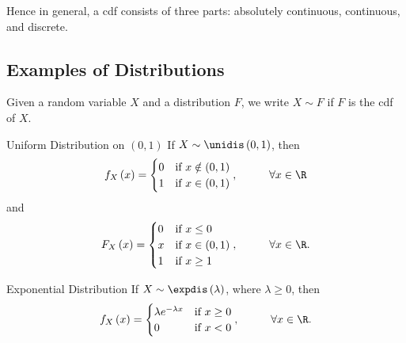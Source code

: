 \documentclass[stat901]{subfiles}
\begin{document}
    \np Hence in general, a cdf consists of three parts: absolutely continuous, continuous, and discrete.

    \subsection{Examples of Distributions}

    Given a random variable $X$ and a distribution $F$, we write $X\sim F$ if $F$ is the cdf of $X$.

    \clearpage

    \begin{example}{Uniform Distribution on $\left( 0,1 \right)$}
        If $X\sim\unidis\left( 0,1 \right)$, then
        \begin{equation*}
            f_X\left( x \right) = \begin{cases} 0 & \text{if $x\notin\left( 0,1 \right)$} \\ 1 & \text{if $x\in\left( 0,1 \right)$} \end{cases},\hspace{1cm}\forall x\in\R
        \end{equation*}
        and
        \begin{equation*}
            F_X\left( x \right) = \begin{cases} 0 & \text{if $x\leq 0$} \\ x & \text{if $x\in\left( 0,1 \right)$} \\ 1 & \text{if $x\geq 1$} \end{cases}, \hspace{1cm}\forall x\in\R.
        \end{equation*}
    \end{example}

    \rruleline
    
    \begin{example}{Exponential Distribution}
        If $X\sim\expdis\left( \lambda \right)$, where $\lambda\geq 0$, then
        \begin{equation*}
            f_X\left( x \right) = \begin{cases} \lambda e^{-\lambda x} & \text{if $x\geq 0$} \\ 0 & \text{if $x<0$} \end{cases},\hspace{1cm}\forall x\in\R.
        \end{equation*}
    \end{example}
    
\end{document}
